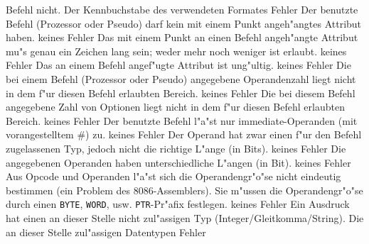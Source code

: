 \documentclass[12pt,a4paper,twoside]{report}
\newcommand{\tty}[1]{{\tt #1}}
\begin{document}
{\begin{description}
{                Befehl nicht.}
               {Der Kennbuchstabe des verwendeten Formates}
               {Fehler}
               {Der benutzte Befehl (Prozessor oder Pseudo) darf
                kein mit einem Punkt angeh"angtes Attribut haben.}
               {keines}
               {Fehler}
               {Das mit einem Punkt an einen Befehl angeh"angte
                Attribut mu"s genau ein Zeichen lang sein; weder mehr noch
                weniger ist erlaubt.}
               {keines}
               {Fehler}
               {Das an einem Befehl angef"ugte Attribut ist ung"ultig.}
               {keines}
               {Fehler}
               {Die bei einem Befehl (Prozessor oder Pseudo)
                angegebene Operandenzahl liegt nicht in dem f"ur diesen
                Befehl erlaubten Bereich.}
               {keines}
               {Fehler}
               {Die bei diesem Befehl angegebene Zahl
	        von Optionen liegt nicht in dem f"ur diesen
                Befehl erlaubten Bereich.}
               {keines}
               {Fehler}
               {Der benutzte Befehl l"a"st nur
                immediate-Operanden (mit vorangestelltem \#) zu.}
               {keines}
               {Fehler}
               {Der Operand hat zwar einen f"ur den Befehl
                zugelassenen Typ, jedoch nicht die richtige L"ange (in
                Bits).}
               {keines}
               {Fehler}
               {Die angegebenen Operanden haben unterschiedliche
                L"angen (in Bit).}
               {keines}
               {Fehler}
               {Aus Opcode und Operanden l"a"st sich die
                Operandengr"o"se nicht eindeutig bestimmen (ein Problem
                des 8086-Assemblers).  Sie m"ussen die Operandengr"o"se
                durch einen \tty{BYTE}, \tty{WORD}, usw. \tty{PTR}-Pr"afix
	        festlegen.}
               {keines}
               {Fehler}
               {Ein Ausdruck hat einen an dieser Stelle nicht
                zul"assigen Typ (Integer/Gleitkomma/String).}
               {Die an dieser Stelle zul"assigen Datentypen}
               {Fehler}

\end{description}}
\end{document}
